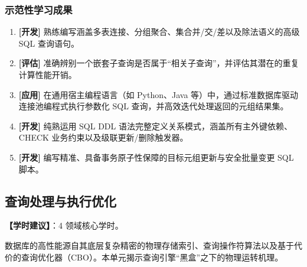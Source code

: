\subsubsection{示范性学习成果}
\begin{enumerate}
    \item \textbf{[开发]} 熟练编写涵盖多表连接、分组聚合、集合并/交/差以及除法语义的高级 SQL 查询语句。
    \item \textbf{[评估]} 准确辨别一个嵌套子查询是否属于“相关子查询”，并评估其潜在的重复计算性能开销。
    \item \textbf{[应用]} 在通用宿主编程语言（如 Python、Java 等）中，通过标准数据库驱动连接池编程式执行参数化 SQL 查询，并高效迭代处理返回的元组结果集。
    \item \textbf{[开发]} 纯熟运用 SQL DDL 语法完整定义关系模式，涵盖所有主外键依赖、CHECK 业务约束以及级联更新/删除触发器。
    \item \textbf{[开发]} 编写精准、具备事务原子性保障的目标元组更新与安全批量变更 SQL 脚本。
\end{enumerate}

\subsection{查询处理与执行优化}
\textbf{【学时建议】}：4 领域核心学时。

数据库的高性能源自其底层复杂精密的物理存储索引、查询操作符算法以及基于代价的查询优化器（CBO）。本单元揭示查询引擎“黑盒”之下的物理运转机理。

